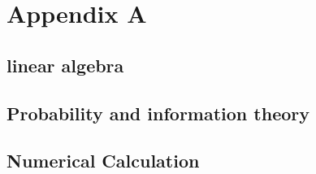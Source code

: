 \chapter{Appendix A}



\section{linear algebra}


\section{Probability and information theory}


\section{Numerical Calculation}